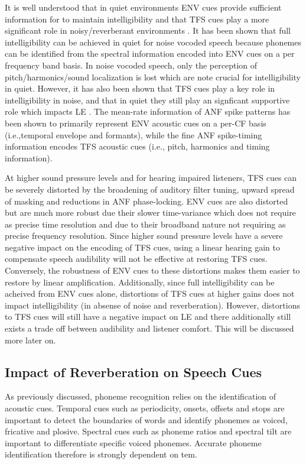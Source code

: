 It is well understood that in quiet environments ENV cues provide sufficient information for to maintain intelligibility and that TFS cues play a more significant role in noisy/reverberant environments \citep{shannon1995speech, smith2002chimaeric}. It has been shown that full intelligibility can be achieved in quiet for noise vocoded speech because phonemes can be identified from the spectral information encoded into ENV cues on a per frequency band basis. In noise vocoded speech, only the perception of pitch/harmonics/sound localization is lost which are note crucial for intelligibility in quiet. However, it has also been shown that TFS cues play a key role in intelligibility in noise, and that in quiet they still play an signficant supportive role which impacts LE \citep{wirtzfeld2017predictions}. The mean-rate information of ANF spike patterns has been shown to primarily represent ENV acoustic cues on a per-CF basis (i.e.,temporal envelope and formants), while the fine ANF spike-timing information encodes TFS acoustic cues (i.e., pitch, harmonics and timing information).

At higher sound pressure levels and for hearing impaired listeners, TFS cues can be severely distorted by the broadening of auditory filter tuning, upward spread of masking and reductions in ANF phase-locking. ENV cues are also distorted but are much more robust due their slower time-variance which does not require as precise time resolution and due to their broadband nature not requiring as precise frequency resolution. Since higher sound pressure levels have a severe negative impact on the encoding of TFS cues, using a linear hearing gain to compensate speech audibility will not be effective at restoring TFS cues. Conversely, the robustness of ENV cues to these distortions makes them easier to restore by linear amplification. Additionally, since full intelligibility can be acheived from ENV cues alone, distortions of TFS cues at higher gains does not impact intelligibility (in absense of noise and reverberation). However, distortions to TFS cues will still have a negative impact on LE and there additionally still exists a trade off between audibility and listener comfort. This will be discussed more later on.


\subsection{Impact of Reverberation on Speech Cues} \label{reverb_impact_speech_cues}

As previously discussed, phoneme recognition relies on the identification of acoustic cues. Temporal cues such as periodicity, onsets, offsets and stops are important to detect the boundaries of words and identify phonemes as voiced, fricative and plosive. Spectral cues such as phoneme ratios and spectral tilt are important to differentiate specific voiced phonemes. Accurate phoneme identification therefore is strongly dependent on tem. 

